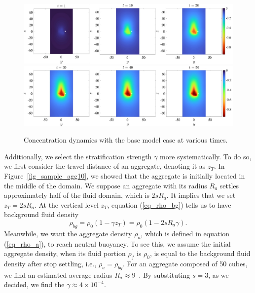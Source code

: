 \begin{figure}[ht]
	\begin{center}
		\includegraphics[scale=0.65]{./figures/fig_NC50_snaps_pt1.pdf}
		\includegraphics[scale=0.65]{./figures/fig_NC50_snaps_pt2.pdf}
	\caption{Concentration dynamics with the base model case at various times.}
	\label{fig_NC50_snaps_all}
\end{center}
\end{figure}
\par
Additionally, we select the stratification strength $\gamma$ more systematically. 
To do so, we first consider the travel distance of an aggregate, denoting it as $z_T$. In Figure~\ref{fig_sample_agg10}, we showed that the aggregate is initially located in the middle of the domain. We suppose an aggregate with its radius $R_a$ settles approximately half of the fluid domain, which is $2 s R_a$. It implies that we set $z_T = 2sR_a$.
At the vertical level $z_T$, equation (\ref{eq_rho_bg}) tells us to have background fluid density 
\begin{equation}
	\rho_{bg} = \rho_0 (1-\gamma z_T) =	\rho_0 (1 - 2sR_a \gamma).
	\label{eq_compute_G}
\end{equation}
Meanwhile, we want the aggregate density $\rho_a$, which is defined in equation (\ref{eq_rho_a}), to reach neutral buoyancy. To see this, we assume the initial aggregate density, when its fluid portion $\rho_f$ is $\rho_0$, is equal to the background fluid density after stop settling, i.e., $\rho_a = \rho_{bg}$. 
For an aggregate composed of 50 cubes, we find an estimated average radius $R_a \approx 9$~\cite{yoo_hydrodynamic_2020}. By substituting $s = 3$, as we decided, we find the $\gamma \approx 4 \times 10^{-4}$.  
